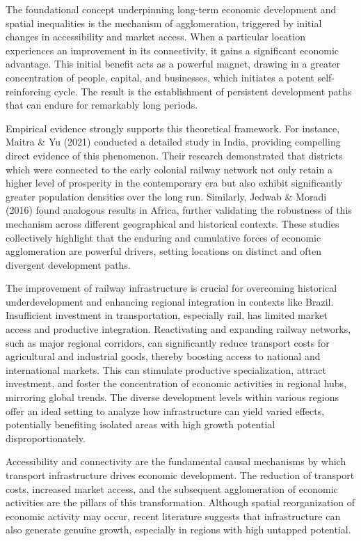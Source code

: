 \documentclass[12pt, a4paper]{article}
\begin{document}
The foundational concept underpinning long-term economic development and spatial inequalities is the mechanism of agglomeration, triggered by initial changes in accessibility and market access. When a particular location experiences an improvement in its connectivity, it gains a significant economic advantage. This initial benefit acts as a powerful magnet, drawing in a greater concentration of people, capital, and businesses, which initiates a potent self-reinforcing cycle. The result is the establishment of persistent development paths that can endure for remarkably long periods.

Empirical evidence strongly supports this theoretical framework. For instance, Maitra \& Yu (2021) conducted a detailed study in India, providing compelling direct evidence of this phenomenon. Their research demonstrated that districts which were connected to the early colonial railway network not only retain a higher level of prosperity in the contemporary era but also exhibit significantly greater population densities over the long run. Similarly, Jedwab \& Moradi (2016) found analogous results in Africa, further validating the robustness of this mechanism across different geographical and historical contexts. These studies collectively highlight that the enduring and cumulative forces of economic agglomeration are powerful drivers, setting locations on distinct and often divergent development paths.

The improvement of railway infrastructure is crucial for overcoming historical underdevelopment and enhancing regional integration in contexts like Brazil. Insufficient investment in transportation, especially rail, has limited market access and productive integration. Reactivating and expanding railway networks, such as major regional corridors, can significantly reduce transport costs for agricultural and industrial goods, thereby boosting access to national and international markets. This can stimulate productive specialization, attract investment, and foster the concentration of economic activities in regional hubs, mirroring global trends. The diverse development levels within various regions offer an ideal setting to analyze how infrastructure can yield varied effects, potentially benefiting isolated areas with high growth potential disproportionately.

Accessibility and connectivity are the fundamental causal mechanisms by which transport infrastructure drives economic development. The reduction of transport costs, increased market access, and the subsequent agglomeration of economic activities are the pillars of this transformation. Although spatial reorganization of economic activity may occur, recent literature suggests that infrastructure can also generate genuine growth, especially in regions with high untapped potential.
\end{document}

